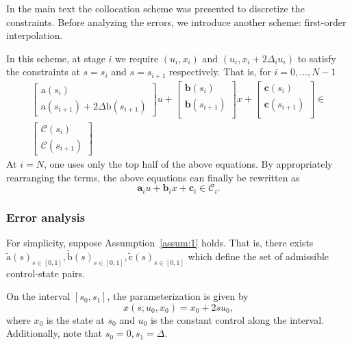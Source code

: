 \documentclass[journal]{IEEEtran}
\theoremstyle{plain}
\theoremstyle{definition}
\theoremstyle{definition}
\renewcommand{\vec}[1]{\bm{\mathrm{#1}}}  %
\newcommand{\cC}{\mathscr{C}}
\begin{document}
In the main text the collocation scheme was presented to discretize
the constraints.  Before analyzing the errors, we introduce another
scheme: first-order interpolation.

In this scheme, at stage $i$ we require $(u_{i}, x_{i})$ and
$(u_{i}, x_{i} + 2 \Delta_{i} u_{i})$ to satisfy the constraints at $s=s_i$ and
$s=s_{i+1}$ respectively. That is, for $i=0,\dots,N-1$
\begin{equation}
  \label{eq:first-order-inerpo}
  \begin{aligned}
    \begin{bmatrix}
      \vec a(s_i)  \\
      \vec a(s_{i+1}) + 2 \Delta\vec b(s_{i+1})
   \end{bmatrix} u
   +
   \begin{bmatrix}
     \mathbf{b}(s_i)  \\
     \mathbf{b}(s_{i+1})  \\
   \end{bmatrix}
   x+
   \begin{bmatrix}
     \mathbf{c}(s_i)   \\
     \mathbf{c}(s_{i+1})   \\
   \end{bmatrix} \in
    \\
   \begin{bmatrix}
     \cC(s_i)\\
     \cC(s_{i+1})
   \end{bmatrix}
  \end{aligned}
\end{equation}
At $i=N$, one uses only the top half of the above equations. By
appropriately rearranging the terms, the above equations can finally
be rewritten as
\begin{equation}
  \label{eq:gen-form2}
    \mathbf{a}_i u + \mathbf{b}_i x+ \mathbf{c}_i \in \cC_i.
\end{equation}

\subsubsection{Error analysis}
\label{sec:error-analysis}
For simplicity, suppose Assumption~\ref{assum:1} holds. That is, there
exists
$\tilde{\vec a}(s)_{s\in [0, 1]}, \tilde{\vec b}(s)_{s\in [0, 1]},
\tilde{\vec c}(s)_{s\in [0, 1]}$ which define the set of admissible
control-state pairs. 

On the interval $[s_0, s_1]$, the parameterization is given by
\begin{equation*}
  x(s; u_0, x_0) = x_0 + 2 s u_0,
\end{equation*}
where $x_0$ is the state at $s_0$ and $u_0$ is the constant control
along the interval.
Additionally, note that $s_0 = 0, s_1=\Delta$.
\end{document}
